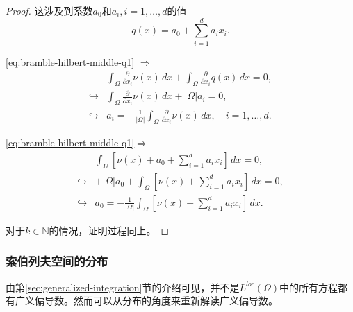 \begin{proof}
这涉及到系数$a_0$和$a_i, i=1,\ldots,d$的值
\begin{equation*}
  q(x) = a_0 + \sum_{i=1}^{d} a_i x_i.
\end{equation*}

\eqref{eq:bramble-hilbert-middle-q1} $\Rightarrow$
\begin{equation*}
  \begin{split}
    &\int_{\Omega} \frac{\partial}{\partial x_i} \nu(x) \, dx
    + \int_{\Omega} \frac{\partial}{\partial x_i} q(x) \, dx
    = 0, \\
    \hookrightarrow &
    \int_{\Omega} \frac{\partial}{\partial x_i} \nu(x) \, dx
    + \left| \Omega \right| a_i = 0, \\
    \hookrightarrow &
    a_i = - \frac{1}{\left| \Omega \right|} \int_{\Omega} \frac{\partial}{\partial x_i} \nu(x) \, dx, \quad i = 1,\ldots,d.
  \end{split}
\end{equation*}

\eqref{eq:bramble-hilbert-middle-q1}$\Rightarrow$
\begin{equation*}
  \begin{split}
    &\int_{\Omega} \left[\nu(x)  +  a_0 + \sum_{i=1}^{d} a_i x_i \right] \, dx = 0, \\
    \hookrightarrow &
    + \left| \Omega \right| a_0 +  \int_{\Omega} \left[\nu(x)  +  \sum_{i=1}^{d} a_i x_i \right] \, dx = 0, \\
    \hookrightarrow & a_0 = - \frac{1}{\left| \Omega \right|} \int_{\Omega} \left[\nu(x)  +  \sum_{i=1}^{d} a_i x_i \right] \, dx.
  \end{split}
\end{equation*}

对于$k \in \mathbb{N}$的情况，证明过程同上。
\end{proof}


\subsubsection{索伯列夫空间的分布}
\label{sec:sobolev-space-distributions}
由第\ref{sec:generalized-integration}节的介绍可见，并不是$L^{loc}(\Omega)$中的所有方程都有广义偏导数。然而可以从分布的角度来重新解读广义偏导数\citep{McLean:2000ta}。

